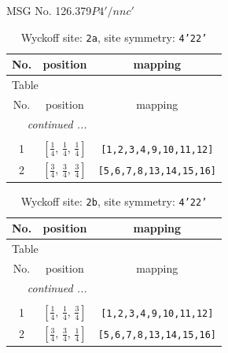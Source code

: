 \documentclass[fleqn,8pt]{jsarticle}
\begin{document}
\setcounter{MaxMatrixCols}{32}

\renewcommand{\tablename}{Table~}
\renewcommand{\figurename}{Figure~}
\begin{center}
\LARGE
MSG No. 126.379\quad$P4'/nnc'$
\end{center}
\renewcommand{\arraystretch}{1.2}
\begin{longtable}{ccc}
\caption{Wyckoff site: {\tt 2a}, site symmetry: {\tt 4'22'}}
 \\
 \hline \hline
No. & position & mapping \\ \hline \endfirsthead

\multicolumn{2}{l}{\tablename\ \thetable{}} \\
 \hline \hline
No. & position & mapping \\ \hline \endhead

 \hline \hline
\multicolumn{2}{r}{\footnotesize\it continued ...} \\ \endfoot

 \hline \hline
\multicolumn{2}{r}{} \\ \endlastfoot

1 & $\left[ \frac{1}{4},\, \frac{1}{4},\, \frac{1}{4} \right]$ & {\tt [1,2,3,4,9,10,11,12]} \\ \hline
2 & $\left[ \frac{3}{4},\, \frac{3}{4},\, \frac{3}{4} \right]$ & {\tt [5,6,7,8,13,14,15,16]} \\
\end{longtable}
\renewcommand{\arraystretch}{1.2}
\begin{longtable}{ccc}
\caption{Wyckoff site: {\tt 2b}, site symmetry: {\tt 4'22'}}
 \\
 \hline \hline
No. & position & mapping \\ \hline \endfirsthead

\multicolumn{2}{l}{\tablename\ \thetable{}} \\
 \hline \hline
No. & position & mapping \\ \hline \endhead

 \hline \hline
\multicolumn{2}{r}{\footnotesize\it continued ...} \\ \endfoot

 \hline \hline
\multicolumn{2}{r}{} \\ \endlastfoot

1 & $\left[ \frac{1}{4},\, \frac{1}{4},\, \frac{3}{4} \right]$ & {\tt [1,2,3,4,9,10,11,12]} \\ \hline
2 & $\left[ \frac{3}{4},\, \frac{3}{4},\, \frac{1}{4} \right]$ & {\tt [5,6,7,8,13,14,15,16]} \\
\end{longtable}
\end{document}
